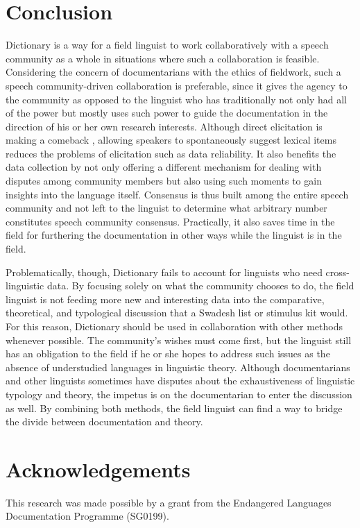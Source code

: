 \documentclass[output=paper,
modfonts
]{langscibook}
\begin{document}
\section{Conclusion}

Dictionary  is a way for a field linguist to work collaboratively with a speech community as a whole in situations where such a collaboration is feasible. Considering the concern of documentarians with the ethics of fieldwork, such a speech community-driven collaboration is preferable, since it gives the agency to the community as opposed to the linguist who has traditionally not only had all of the power but mostly uses such power to guide the documentation in the direction of his or her own research interests. Although direct elicitation is making a comeback \citep{Matthewson2004}, allowing speakers to spontaneously suggest lexical items reduces the problems of elicitation such as data reliability. It also benefits the data collection by not only offering a different mechanism for dealing with disputes among community members but also using such moments to gain insights into the language itself. Consensus is thus built among the entire speech community and not left to the linguist to determine what arbitrary number constitutes speech community consensus. Practically, it also saves time in the field for furthering the documentation in other ways while the linguist is in the field. 

Problematically, though, Dictionary  fails to account for linguists who need cross-linguistic data. By focusing solely on what the community chooses to do, the field linguist is not feeding more new and interesting data into the comparative, theoretical, and typological discussion that a Swadesh list or stimulus kit would. For this reason, Dictionary  should be used in collaboration with other methods whenever possible. The community’s wishes must come first, but the linguist still has an obligation to the field if he or she hopes to address such issues as the absence of understudied languages in linguistic theory. Although documentarians and other linguists sometimes have disputes about the exhaustiveness of linguistic typology and theory, the impetus is on the documentarian to enter the discussion as well. By combining both methods, the field linguist can find a way to bridge the divide between documentation and theory. 

 


\section*{Acknowledgements}
This research was made possible by a grant from the Endangered Languages Documentation Programme (SG0199).

{\sloppy
\printbibliography[heading=subbibliography,notkeyword=this]
}
\end{document}
